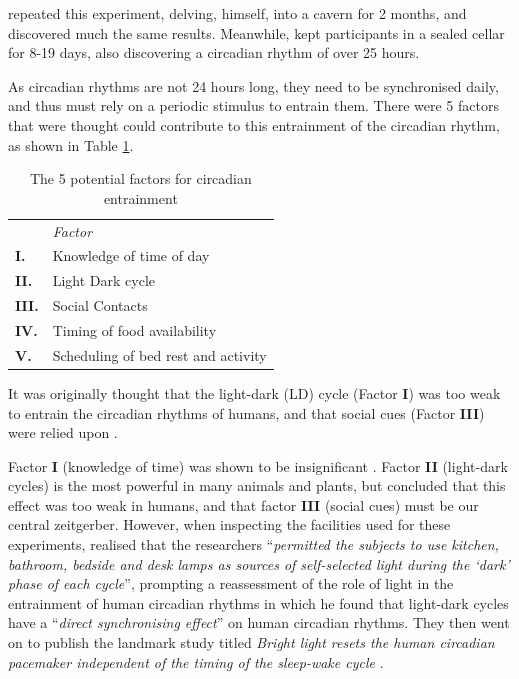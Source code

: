 \citet{siffreTime1964} repeated this experiment, delving, himself, into a cavern for 2 months, and discovered much the same results. Meanwhile, \citet{vonaschoffSpontanperiodikMenschenBei1962} kept participants in a sealed cellar for 8-19 days, also discovering a circadian rhythm of over 25 hours.

As circadian rhythms are not 24 hours long, they need to be synchronised daily, and thus must rely on a periodic stimulus to entrain them. There were 5 factors that were thought could contribute to this entrainment of the circadian rhythm, as shown in Table \ref{Tab:Factors}.

\begin{table}
\caption{The 5 potential factors for circadian entrainment \citep{czeislerEntrainmentHumanOrcadian1981}}
\label{Tab:Factors}
\begin{tabular}{l l}
\hline
 & \textit{Factor} \\
\textbf{I.}& Knowledge of time of day \\
\textbf{II.}& Light Dark cycle \\
\textbf{III.}& Social Contacts \\
\textbf{IV.}& Timing of food availability \\
\textbf{V.}& Scheduling of bed rest and activity \\
\hline
\end{tabular}
\end{table}


It was originally thought that the light-dark (LD) cycle (Factor \textbf{I}) was too weak to entrain the circadian rhythms of humans, and that social cues (Factor \textbf{III}) were relied upon \citep{aschoffHumanCircadianRhythms1971}. 

Factor \textbf{I} (knowledge of time) was shown to be insignificant \citep{millsCircadianRhythmsThree1964}. Factor \textbf{II} (light-dark cycles) is the most powerful in many animals and plants, but \citet{aschoffHumanCircadianRhythms1971} concluded that this effect was too weak in humans, and that factor \textbf{III} (social cues) must be our central zeitgerber. However, when inspecting the facilities used for these experiments, \citet{czeislerEntrainmentHumanOrcadian1981} realised that the researchers ``\textit{permitted the subjects to use kitchen, bathroom, bedside and desk lamps as sources of self-selected light during the `dark' phase of each cycle}'', prompting a reassessment of the role of light in the entrainment of human circadian rhythms in which he found that light-dark cycles have a ``\textit{direct synchronising effect}'' on human circadian rhythms. They then went on to publish the landmark study titled \textit{Bright light resets the human circadian pacemaker independent of the timing of the sleep-wake cycle} \citep{czeislerBrightLightResets1986}.

